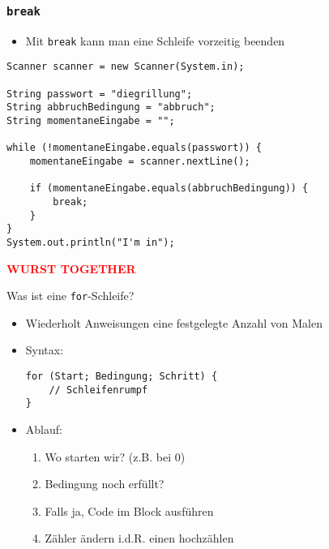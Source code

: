 \documentclass{../../presentation}
\begin{document}
\begin{frame}[fragile]
  \frametitle{\texttt{break}}

  \begin{itemize}
    \item Mit \texttt{break} kann man eine Schleife vorzeitig beenden
\end{itemize}

\begin{verbatim}
Scanner scanner = new Scanner(System.in);

String passwort = "diegrillung";
String abbruchBedingung = "abbruch";
String momentaneEingabe = "";

while (!momentaneEingabe.equals(passwort)) {
    momentaneEingabe = scanner.nextLine();

    if (momentaneEingabe.equals(abbruchBedingung)) {
        break;
    }
}
System.out.println("I'm in");
\end{verbatim}
\end{frame}


\begin{frame}[plain]
    \centering
    {\Huge\bfseries\textcolor{red}{WURST TOGETHER}}
\end{frame}



\begin{frame}[fragile]{Was ist eine \texttt{for}-Schleife?}

  \begin{itemize}
    \item Wiederholt Anweisungen eine festgelegte Anzahl von Malen
    \item Syntax:
      \begin{verbatim}
for (Start; Bedingung; Schritt) {
    // Schleifenrumpf
}
\end{verbatim}
\item Ablauf:
    \begin{enumerate}
    \item Wo starten wir? (z.B. bei 0)
    \item Bedingung noch erfüllt?
    \item Falls ja, Code im Block ausführen
    \item Zähler ändern i.d.R. einen hochzählen
\end{enumerate}
  \end{itemize}
\end{frame}
\end{document}
